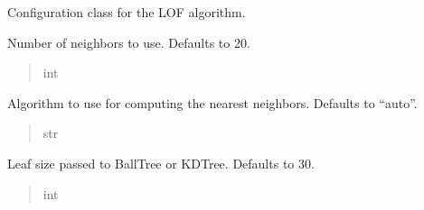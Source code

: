 \documentclass[letterpaper,10pt,english]{sphinxmanual}
\begin{document}
\begin{fulllineitems}
\sphinxAtStartPar
Configuration class for the LOF algorithm.

\begin{fulllineitems}
\label{\detokenize{application.algorithms.lof:application.algorithms.lof.LofConfiguration.LofConfiguration.n_neighbors}}
\pysigstartsignatures
{}
\pysigstopsignatures
\sphinxAtStartPar
Number of neighbors to use. Defaults to 20.
\begin{quote}\begin{description}
\sphinxAtStartPar
int

\end{description}\end{quote}

\end{fulllineitems}


\begin{fulllineitems}
\label{\detokenize{application.algorithms.lof:application.algorithms.lof.LofConfiguration.LofConfiguration.algorithm}}
\pysigstartsignatures
{}
\pysigstopsignatures
\sphinxAtStartPar
Algorithm to use for computing the nearest neighbors. Defaults to “auto”.
\begin{quote}\begin{description}
\sphinxAtStartPar
str

\end{description}\end{quote}

\end{fulllineitems}


\begin{fulllineitems}
\label{\detokenize{application.algorithms.lof:application.algorithms.lof.LofConfiguration.LofConfiguration.leaf_size}}
\pysigstartsignatures
{}
\pysigstopsignatures
\sphinxAtStartPar
Leaf size passed to BallTree or KDTree. Defaults to 30.
\begin{quote}\begin{description}
\sphinxAtStartPar
int


\end{description}
\end{quote}
\end{fulllineitems}
\end{fulllineitems}
\end{document}

